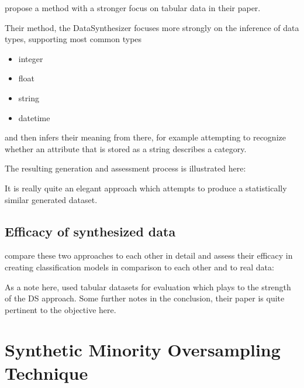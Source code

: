 \cite{ping2017datasynthesizer} propose a method with a stronger focus on tabular data in their paper.

Their method, the DataSynthesizer focuses more strongly on the inference of data types, supporting most common types

\begin{itemize}
	\item integer
	\item float
	\item string
	\item datetime
\end{itemize} 

and then infers their meaning from there, for example attempting to recognize whether an attribute that is stored as a string describes a category.

\pagebreak

The resulting generation and assessment process is illustrated here:


It is really quite an elegant approach which attempts to produce a statistically similar generated dataset.

\clearpage

\subsection{Efficacy of synthesized data}

\label{subsection:efficacy}

\cite{ares_utility} compare these two approaches to each other in detail and assess their efficacy in creating classification models in comparison to each other and to real data:


As a note here, \cite{ares_utility} used tabular datasets for evaluation which plays to the strength of the \ac{DS} approach. Some further notes in the conclusion, their paper is quite pertinent to the objective here.

\pagebreak

\section{Synthetic Minority Oversampling Technique}
\label{section:smote}


